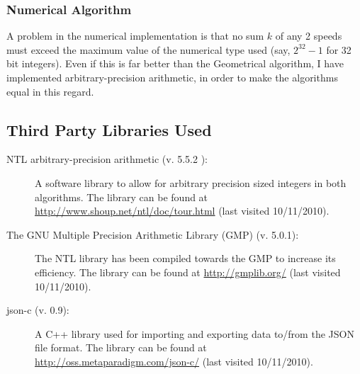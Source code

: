 \subsubsection{Numerical Algorithm}
A problem in the numerical implementation is that no sum $k$ of any 2 speeds must exceed the maximum value of the numerical type used (say, $2^{32} - 1$ for 32 bit integers). Even if this is far better than the Geometrical algorithm, I have implemented arbitrary-precision arithmetic, in order to make the algorithms equal in this regard.

\subsection{Third Party Libraries Used}
\label{third_party}
\begin{description}
\item[NTL arbitrary-precision arithmetic (v. 5.5.2 ):] A software library to allow for arbitrary precision sized integers in both algorithms. The library can be found at \underline{http://www.shoup.net/ntl/doc/tour.html} (last visited 10/11/2010).
\item[The GNU Multiple Precision Arithmetic Library (GMP) (v. 5.0.1):] The NTL library has been compiled towards the GMP to increase its efficiency. The library can be found at \underline{http://gmplib.org/} (last visited 10/11/2010).  
\item[json-c (v. 0.9):] A C++ library used for importing and exporting data to/from the JSON file format. The library can be found at \underline{http://oss.metaparadigm.com/json-c/} (last visited 10/11/2010).
\end{description}
